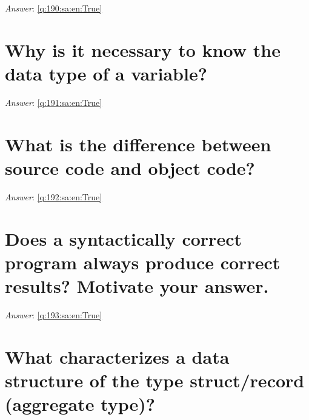 \documentclass[a4paper,11pt,oneside]{book}
\begin{document}
\begin{sloppypar}
\textit{Answer}: \autoref{q:190:sa:en:True}



\section{Why is it necessary to know the data type of a variable?}

\label{q:191:sa:en:False}

\vspace{2cm}

\noindent\makebox[\textwidth]{\hrulefill}

\vspace{1cm}

\textit{Answer}: \autoref{q:191:sa:en:True}



\section{What is the difference between source code and object code?}

\label{q:192:sa:en:False}

\vspace{2cm}

\noindent\makebox[\textwidth]{\hrulefill}

\vspace{1cm}

\textit{Answer}: \autoref{q:192:sa:en:True}



\section{Does a syntactically correct program always produce correct results? Motivate your answer.}

\label{q:193:sa:en:False}

\vspace{2cm}

\noindent\makebox[\textwidth]{\hrulefill}

\vspace{1cm}

\textit{Answer}: \autoref{q:193:sa:en:True}



\section{What characterizes a data structure of the type struct/record (aggregate type)?}


\end{sloppypar}
\end{document}
